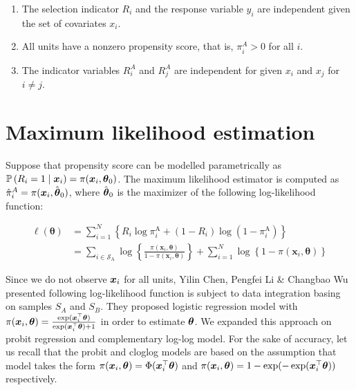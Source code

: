 \documentclass[
  letterpaper,
  DIV=11,
  numbers=noendperiod]{scrreprt}
\begin{document}
\begin{enumerate}
\def\labelenumi{\arabic{enumi}.}
\item
  The selection indicator \(R_i\) and the response variable \(y_i\) are
  independent given the set of covariates \(x_i\).
\item
  All units have a nonzero propensity score, that is, \(\pi_i^A > 0\)
  for all \(i\).
\item
  The indicator variables \(R_i^A\) and \(R_j^A\) are independent for
  given \(x_i\) and \(x_j\) for \(i \neq j\).
\end{enumerate}

\hypertarget{maximum-likelihood-estimation}{%
\section{Maximum likelihood
estimation}\label{maximum-likelihood-estimation}}

Suppose that propensity score can be modelled parametrically as
\(\mathbb{P}\left(R_i=1 \mid \boldsymbol{x}_i\right) = \pi(\boldsymbol{x}_{i}, \boldsymbol{\theta}_{0})\).
The maximum likelihood estimator is computed as
\(\hat{\pi}_{i}^{A} = \pi(\boldsymbol{x}_{i}, \hat{\boldsymbol{\theta}}_{0})\), where
\(\hat{\boldsymbol{\theta}}_{0}\) is the maximizer of the following log-likelihood
function:

\[
    \begin{split}
 \ell(\boldsymbol{\theta}) & =\sum_{i=1}^N\left\{R_i \log \pi_i^{\mathrm{A}}+\left(1-R_i\right) \log \left(1-\pi_i^{\mathrm{A}}\right)\right\} \\ & =\sum_{i \in \mathcal{S}_{\mathrm{A}}} \log \left\{\frac{\pi\left(\boldsymbol{x}_i, \boldsymbol{\theta}\right)}{1-\pi\left(\boldsymbol{x}_i, \boldsymbol{\theta}\right)}\right\}+\sum_{i=1}^N \log \left\{1-\pi\left(\boldsymbol{x}_i, \boldsymbol{\theta}\right)\right\}
    \end{split}
\]

Since we do not observe \(\boldsymbol{x}_i\) for all units, Yilin Chen, Pengfei Li
\& Changbao Wu presented following log-likelihood function is subject to
data integration basing on samples \(S_A\) and \(S_B\). They proposed
logistic regression model with
\(\pi(\boldsymbol{x}_{i}, \boldsymbol{\theta}) = \frac{\exp(\boldsymbol{x}_{i}^{\top}\boldsymbol{\theta})}{\exp(\boldsymbol{x}_{i}^{\top}\boldsymbol{\theta}) + 1}\)
in order to estimate \(\boldsymbol{\theta}\). We expanded this approach on probit
regression and complementary log-log model. For the sake of accuracy,
let us recall that the probit and cloglog models are based on the
assumption that model takes the form
\(\pi(\boldsymbol{x}_{i},\boldsymbol{\theta}) = \Phi(\boldsymbol{x}_{i}^{\top}\boldsymbol{\theta})\) and
\(\pi(\boldsymbol{x}_{i}, \boldsymbol{\theta}) = 1 - \exp(-\exp(\boldsymbol{x}_{i}^{\top}\boldsymbol{\theta}))\)
respectively.
\end{document}
